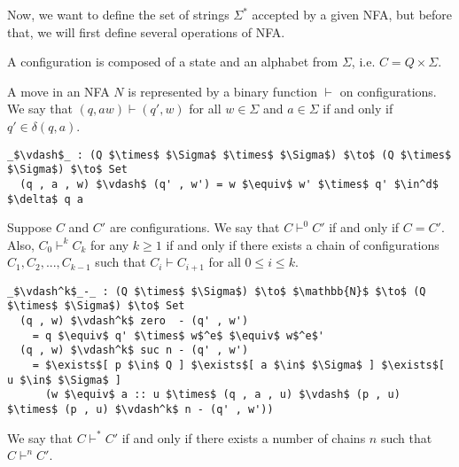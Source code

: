 \par Now, we want to define the set of strings \(\Sigma^*\) accepted by a given
NFA, but before that, we will first define several operations of NFA. 

\begin{defn}
\noindent A configuration is composed of a state and an alphabet from
\(\Sigma\), i.e. \(C = Q \times \Sigma\). 
\end{defn}

\begin{defn}
\noindent A move in an NFA \(N\) is
represented by a binary function \(\vdash\) on configurations. We say
that \((q, aw) \vdash (q' , w)\) for all \(w \in \Sigma\) and \(a \in \Sigma\)
 if and only if \(q' \in \delta (q , a)\). 
\end{defn}

\begin{lstlisting}[mathescape=true]
  _$\vdash$_ : (Q $\times$ $\Sigma$ $\times$ $\Sigma$) $\to$ (Q $\times$ $\Sigma$) $\to$ Set
  (q , a , w) $\vdash$ (q' , w') = w $\equiv$ w' $\times$ q' $\in^d$ $\delta$ q a
\end{lstlisting}

\begin{defn}
\noindent Suppose \(C\) and \(C'\) are configurations. We say that \(C \vdash^0 C'\) if and only
if \(C = C'\). Also, \(C_0 \vdash^k C_k\) for any \(k \geq 1\) if and only if there exists a chain of
configurations \(C_1, C_2, ..., C_{k-1}\) such that \(C_i \vdash C_{i+1}\) for all \(0 \leq i \leq k\). 
\end{defn}

\begin{lstlisting}[mathescape=true]
  _$\vdash^k$_-_ : (Q $\times$ $\Sigma$) $\to$ $\mathbb{N}$ $\to$ (Q $\times$ $\Sigma$) $\to$ Set
  (q , w) $\vdash^k$ zero  - (q' , w')
    = q $\equiv$ q' $\times$ w$^e$ $\equiv$ w$^e$'
  (q , w) $\vdash^k$ suc n - (q' , w') 
    = $\exists$[ p $\in$ Q ] $\exists$[ a $\in$ $\Sigma$ ] $\exists$[ u $\in$ $\Sigma$ ]
      (w $\equiv$ a :: u $\times$ (q , a , u) $\vdash$ (p , u) $\times$ (p , u) $\vdash^k$ n - (q' , w'))
\end{lstlisting}

\begin{defn}
\noindent We say that \(C \vdash^* C'\) if and only
if there exists a number of chains \(n\) such that \(C \vdash^n C'\). 
\end{defn}

